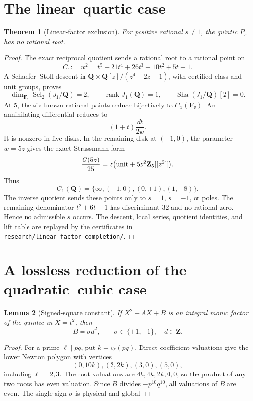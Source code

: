 \documentclass[11pt]{article}
\newtheorem{theorem}{Theorem}
\newtheorem{lemma}[theorem]{Lemma}
\newcommand{\Q}{\mathbf Q}
\begin{document}
\section{The linear--quartic case}

\begin{theorem}[Linear-factor exclusion]\label{thm:linear}
For positive rational $s\ne1$, the quintic $P_s$ has no rational root.
\end{theorem}

\begin{proof}
The exact reciprocal quotient sends a rational root to a rational point on
\[
 C_1:\quad w^2=t^5+21t^4+26t^3+10t^2+5t+1.
\]
A Schaefer--Stoll descent in
$\Q\times\Q[z]/(z^4-2z-1)$, with certified class and unit groups, proves
\[
 \dim_{\mathbf F_2}\operatorname{Sel}_2(J_1/\Q)=2,\qquad
 \operatorname{rank}J_1(\Q)=1,\qquad
 \operatorname{Sha}(J_1/\Q)[2]=0.
\]
At $5$, the six known rational points reduce bijectively to
$C_1(\mathbf F_5)$.  An annihilating differential reduces to
\[
 (1+t)\frac{dt}{2w}.
\]
It is nonzero in five disks.  In the remaining disk at $(-1,0)$, the
parameter $w=5z$ gives the exact Strassmann form
\[
 \frac{G(5z)}{25}
 =z\bigl(\text{\rm unit}+5z^2\mathbf Z_5[[z^2]]\bigr).
\]
Thus
\[
 C_1(\Q)=\{\infty,(-1,0),(0,\pm1),(1,\pm8)\}.
\]
The inverse quotient sends these points only to $s=1$, $s=-1$, or poles.
The remaining denominator $t^2+6t+1$ has discriminant $32$ and no rational
zero.  Hence no admissible $s$ occurs.  The descent, local series, quotient
identities, and lift table are replayed by the certificates in
\texttt{research/linear\_factor\_completion/}.
\end{proof}

\section{A lossless reduction of the quadratic--cubic case}

\begin{lemma}[Signed-square constant]\label{lem:signed}
If $X^2+AX+B$ is an integral monic factor of the quintic in $X=t^2$, then
\[
 B=\sigma d^2,\qquad \sigma\in\{+1,-1\},\quad d\in\mathbf Z.
\]
\end{lemma}

\begin{proof}
For a prime $\ell\mid pq$, put $k=v_\ell(pq)$.  Direct coefficient
valuations give the lower Newton polygon with vertices
\[
 (0,10k),(2,2k),(3,0),(5,0),
\]
including $\ell=2,3$.  The root valuations are
$4k,4k,2k,0,0$, so the product of any two roots has even valuation.
Since $B$ divides $-p^{10}q^{10}$, all valuations of $B$ are even.  The
single sign $\sigma$ is physical and global.
\end{proof}
\end{document}
